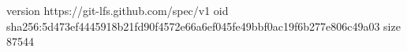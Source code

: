 version https://git-lfs.github.com/spec/v1
oid sha256:5d473ef4445918b21fd90f4572e66a6ef045fe49bbf0ac19f6b277e806c49a03
size 87544
